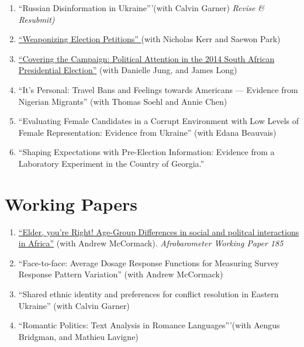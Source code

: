 \documentclass[margin,line]{res}
\begin{document}
{\begin{resume}
\begin{enumerate}
  \item ``Russian Disinformation in Ukraine'''(with Calvin Garner)  \textit{Revise \& Resubmit)}


\item \href {10.31219/osf.io/tsmvz}{``Weaponizing Election Petitions'' }(with
  Nicholas Kerr and Saewon Park)

 \item\href{https://osf.io/preprints/socarxiv/af9jq/}{``Covering the Campaign: Political Attention in the 2014 South African
Presidential Election''} (with Danielle Jung, and James Long)

\item  ``It's Personal: Travel Bans and Feelings towards Americans ---
  Evidence from Nigerian Migrants'' (with Thomas Soehl and Annie Chen)
  
\item ``Evaluating Female Candidates in a Corrupt Environment with Low
Levels of Female Representation: Evidence from Ukraine'' (with Edana Beauvais)

\item ``Shaping Expectations with Pre-Election Information:
Evidence from a Laboratory Experiment in the Country of Georgia.''

\end{enumerate}


\section{\sc Working Papers}
\renewcommand{\labelenumi}{WP\theenumi.}

\begin{enumerate}


\item \href{http://afrobarometer.org/publications/wp185-age-group-differences-social-and-political-interactions-africa}{``Elder, you're Right! Age-Group Differences in social and
  politcal interactions in
  Africa''} (with Andrew McCormack). \textit{Afrobarometer Working
  Paper 185}
  
 \item ``Face-to-face: Average Dosage Response Functions for
    Measuring Survey Response Pattern Variation'' (with Andrew McCormack)

\item ``Shared ethnic identity and preferences for conflict resolution in
Eastern Ukraine'' (with Calvin Garner)

\item ``Romantic Politics: Text Analysis in Romance Languages'''(with Aengus Bridgman, and Mathieu Lavigne)



\end{enumerate}
\end{resume}}
\end{document}
